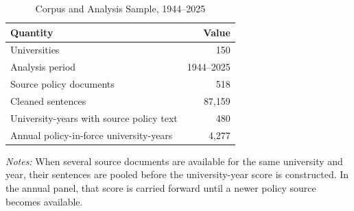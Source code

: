 \begin{table}[htbp]
\centering
\small
\caption{Corpus and Analysis Sample, 1944--2025}
\label{tab:sample}
\begin{threeparttable}
\begin{tabular}{lr}
\toprule
Quantity & Value \\
\midrule
Universities & 150 \\
Analysis period & 1944--2025 \\
Source policy documents & 518 \\
Cleaned sentences & 87,159 \\
University-years with source policy text & 480 \\
Annual policy-in-force university-years & 4,277 \\
\bottomrule
\end{tabular}
\begin{tablenotes}[flushleft]\footnotesize
\item \textit{Notes:} When several source documents are available for the same university and year, their sentences are pooled before the university-year score is constructed. In the annual panel, that score is carried forward until a newer policy source becomes available.
\end{tablenotes}
\end{threeparttable}
\end{table}
